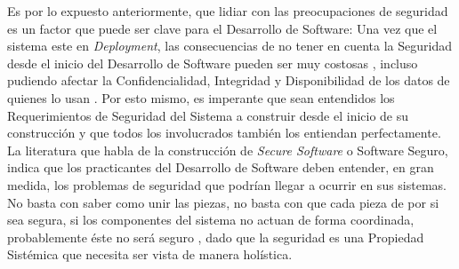 Es por lo expuesto anteriormente, que lidiar con las preocupaciones de seguridad es un factor que puede ser clave para el Desarrollo de Software: Una vez que el sistema este en \textit{Deployment}, las consecuencias de no tener en cuenta la Seguridad desde el inicio del Desarrollo de Software pueden ser muy costosas \cite{cert}, incluso pudiendo afectar la Confidencialidad, Integridad y Disponibilidad de los datos de quienes lo usan \cite{interCoursera}. Por esto mismo, es imperante que sean entendidos los Requerimientos de Seguridad del Sistema a construir desde el inicio de su construcción y que todos los involucrados también los entiendan perfectamente. La literatura que habla de la construcción de \textit{Secure Software} o Software Seguro, indica que los practicantes del Desarrollo de Software deben entender, en gran medida, los problemas de seguridad que podrían llegar a ocurrir en sus sistemas. No basta con saber como unir las piezas, no basta con que cada pieza de por si sea segura, si los componentes del sistema no actuan de forma coordinada, probablemente éste no será seguro \cite{fernandez2013security}, dado que la seguridad es una Propiedad Sistémica que necesita ser vista de manera holística.  


